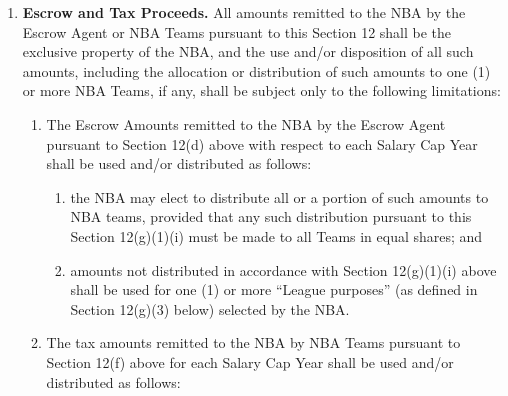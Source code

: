 \documentclass[
]{book}
\providecommand{\tightlist}{%
  \setlength{\itemsep}{0pt}\setlength{\parskip}{0pt}}
\begin{document}
\begin{enumerate}
\begin{enumerate}
  \end{enumerate}
\item
  \textbf{Escrow and Tax Proceeds.} All amounts remitted to the NBA by the Escrow Agent or NBA Teams pursuant to this Section 12 shall be the exclusive property of the NBA, and the use and/or disposition of all such amounts, including the allocation or distribution of such amounts to one (1) or more NBA Teams, if any, shall be subject only to the following limitations:

  \begin{enumerate}
  \def\labelenumii{(\arabic{enumii})}
  \tightlist
  \item
    The Escrow Amounts remitted to the NBA by the Escrow Agent pursuant to Section 12(d) above with respect to each Salary Cap Year shall be used and/or distributed as follows:

    \begin{enumerate}
    \def\labelenumiii{(\roman{enumiii})}
    \tightlist
    \item
      the NBA may elect to distribute all or a portion of such amounts to NBA teams, provided that any such distribution pursuant to this Section 12(g)(1)(i) must be made to all Teams in equal shares; and
    \item
      amounts not distributed in accordance with Section 12(g)(1)(i) above shall be used for one (1) or more ``League purposes'' (as defined in Section 12(g)(3) below) selected by the NBA.
    \end{enumerate}
  \item
    The tax amounts remitted to the NBA by NBA Teams pursuant to Section 12(f) above for each Salary Cap Year shall be used and/or distributed as follows:


\end{enumerate}
\end{enumerate}
\end{document}

